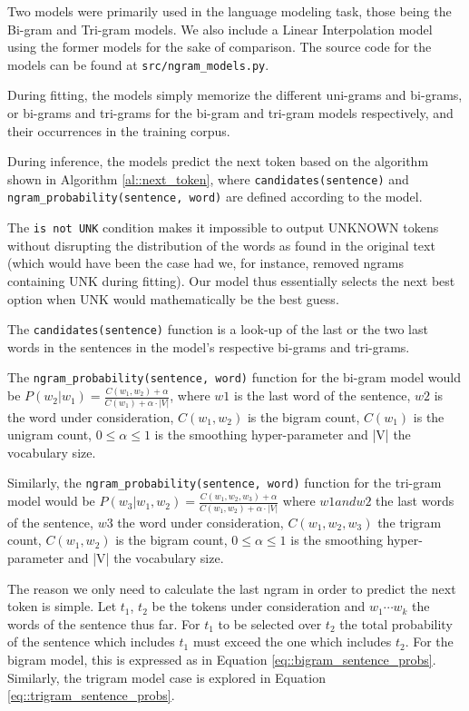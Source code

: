 \documentclass[11pt, a4paper]{article}
\begin{document}
	Two models were primarily used in the language modeling task, those being the Bi-gram and Tri-gram models. We also include a Linear Interpolation model using the former models for the sake of comparison. The source code for the models can be found at \texttt{src/ngram\_models.py}.
	
	During fitting, the models simply memorize the different uni-grams and bi-grams, or bi-grams and tri-grams for the bi-gram and tri-gram models respectively, and their occurrences in the training corpus. 
	
	During inference, the models predict the next token based on the algorithm shown in Algorithm \ref{al::next_token}, where \texttt{candidates(sentence)} and \texttt{ngram\_probability(sentence, word)} are defined according to the model. 
	
	The \texttt{is not UNK} condition makes it impossible to output UNKNOWN tokens without disrupting the distribution of the words as found in the original text (which would have been the case had we, for instance, removed ngrams containing UNK during fitting). Our model thus essentially selects the next best option when UNK would mathematically be the best guess.
	
	The \texttt{candidates(sentence)} function is a look-up of the last or the two last words in the sentences in the model's respective bi-grams and tri-grams.
	
	The \texttt{ngram\_probability(sentence, word)} function for the bi-gram model would be $ P(w_2|w_1) = \frac{C(w_1,w_2) + \alpha}{C(w_1) + \alpha \cdot|V|} $, where  $w1$ is the last word of the sentence, $w2$ is the word under consideration, $ C(w_1,w_2) $ is the bigram count, $ C(w_1) $ is the unigram count, $ 0 \leq\alpha \leq1 $ is the smoothing hyper-parameter and |V| the vocabulary size.
	
	Similarly, the \texttt{ngram\_probability(sentence, word)} function for the tri-gram model would be $ P(w_3|w_1,w_2) = \frac{C(w_1,w_2,w_3) + \alpha}{C(w_1,w_2) + \alpha \cdot |V|} $ where  $w1 and w2$ the last words of the sentence, $w3$ the word under consideration, $ C(w_1,w_2,w_3) $ the trigram count, $ C(w_1,w_2) $ is the bigram count, $ 0 \leq\alpha \leq1 $ is the smoothing hyper-parameter and |V| the vocabulary size.
	
	The reason we only need to calculate the last ngram in order to predict the next token is simple. Let $t_1$, $t_2$ be the tokens under consideration and $w_1 \cdots w_k$ the words of the sentence thus far. For $t_1$ to be selected over $t_2$ the total probability of the sentence which includes $t_1$ must exceed the one which includes $t_2$. For the bigram model, this is expressed as in Equation \ref{eq::bigram_sentence_probs}. Similarly, the trigram model case is explored in Equation \ref{eq::trigram_sentence_probs}. 
	
\end{document}
